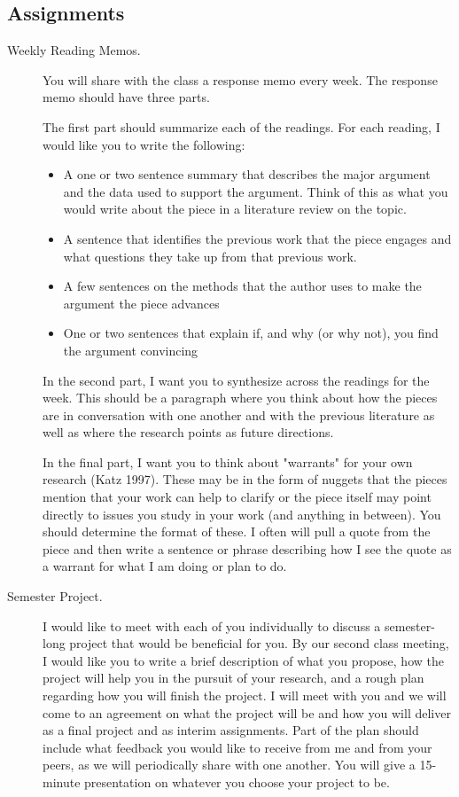 \documentclass[11pt]{syllabus}
\begin{document}
\subsection{Assignments}
\begin{description}
\item[Weekly Reading Memos.] You will share with the class a response memo every week. The response memo should have three parts.

The first part should summarize each of the readings. For each reading, I would like you to write the following:

\begin{itemize}
    \item A one or two sentence summary that describes the major argument and the data used to support the argument. Think of this as what you would write about the piece in a literature review on the topic.
    \item A sentence that identifies the previous work that the piece engages and what questions they take up from that previous work.
    \item A few sentences on the methods that the author uses to make the argument the piece advances
    \item One or two sentences that explain if, and why (or why not), you find the argument convincing
\end{itemize}

In the second part, I want you to synthesize across the readings for the week. This should be a paragraph where you think about how the pieces are in conversation with one another and with the previous literature as well as where the research points as future directions. 

In the final part, I want you to think about "warrants" for your own research (Katz 1997). These may be in the form of nuggets that the pieces mention that your work can help to clarify or the piece itself may point directly to issues you study in your work (and anything in between). You should determine the format of these. I often will pull a quote from the piece and then write a sentence or phrase describing how I see the quote as a warrant for what I am doing or plan to do.

\item[Semester Project.] I would like to meet with each of you individually to discuss a semester-long project that would be beneficial for you. By our second class meeting, I would like you to write a brief description of what you propose, how the project will help you in the pursuit of your research, and a rough plan regarding how you will finish the project. I will meet with you and we will come to an agreement on what the project will be and how you will deliver as a final project and as interim assignments. Part of the plan should include what feedback you would like to receive from me and from your peers, as we will periodically share with one another. You will give a 15-minute presentation on whatever you choose your project to be.

\end{description}
\end{document}
